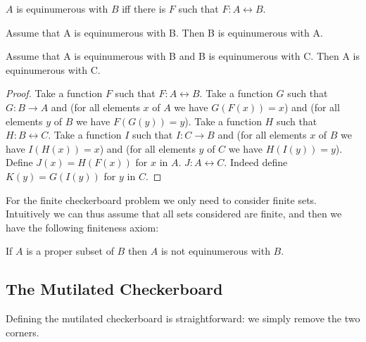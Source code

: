 \begin{forthel}
    \begin{definition}
        $A$ is equinumerous with $B$ iff there is $F$ such that $F : A \leftrightarrow B$.
    \end{definition}

    \begin{lemma}
        Assume that A is equinumerous with B. Then B is equinumerous with A.
    \end{lemma}

    \begin{lemma}
        Assume that A is equinumerous with B and B is equinumerous with C.
        Then A is equinumerous with C.
    \end{lemma}
    \begin{proof}
        Take a function $F$ such that $F : A \leftrightarrow B$.
        Take a function $G$ such that $G : B \to A$ and (for all elements $x$ of $A$ we have $G(F(x)) = x$) and
        (for all elements $y$ of $B$ we have $F(G(y))=y$).
        Take a function $H$ such that $H : B \leftrightarrow C$.
        Take a function $I$ such that $I : C \to B$ and (for all elements $x$ of $B$ we have $I(H(x)) = x$) and
        (for all elements $y$ of $C$ we have $H(I(y))=y$).
        Define $J(x) = H(F(x))$ for $x$ in $A$.
        $J : A \leftrightarrow C$. Indeed define $K(y) = G(I(y))$ for $y$ in $C$.
    \end{proof}
\end{forthel}


For the finite checkerboard problem we only need to consider finite sets.
Intuitively we can thus assume that all sets considered are finite, and then
we have the following finiteness axiom:

\begin{forthel}
    \begin{axiom}
        If $A$ is a proper subset of $B$ then $A$ is not equinumerous with $B$.
    \end{axiom}
\end{forthel}


\subsection{The Mutilated Checkerboard}

Defining the mutilated checkerboard is straightforward:
we simply remove the two corners.

